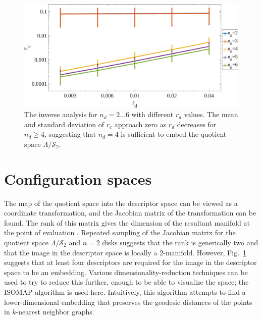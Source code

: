 \documentclass[default,iicol]{sn-jnl}%
\theoremstyle{thmstyleone}%
\theoremstyle{thmstyletwo}%
\theoremstyle{thmstylethree}%
\begin{document}
\begin{figure}
	\centering
	\includegraphics[width=1.0\columnwidth]{figure6.eps}
	\caption{The inverse analysis for $n_d = 2 \dots 6$ with different $r_d$ values. The mean and standard deviation of $r_c$ approach zero as $r_d$ decreases for $n_d \ge 4$, suggesting that $n_d = 4$ is sufficient to embed the quotient space $\Lambda/\mathcal{S}_2$.}
	\label{fig:figure6}
\end{figure}


\section{Configuration spaces}
\label{sec:configuration_spaces}

The map of the quotient space into the descriptor space can be viewed as a coordinate transformation, and the Jacobian matrix of the transformation can be found. The rank of this matrix gives the dimension of the resultant manifold at the point of evaluation \cite{krantz2012implicit}. Repeated sampling of the Jacobian matrix for the quotient space $\Lambda/\mathcal{S}_2$ and $n = 2$ disks suggests that the rank is generically two and that the image in the descriptor space is locally a $2$-manifold. However, Fig.\ \ref{fig:figure6} suggests that at least four descriptors are required for the image in the descriptor space to be an embedding. Various dimensionality-reduction techniques can be used to try to reduce this further, enough to be able to visualize the space; the ISOMAP algorithm \cite{Tenenbaum2319} is used here. Intuitively, this algorithm attempts to find a lower-dimensional embedding that preserves the geodesic distances of the points in $k$-nearest neighbor graphs.
\end{document}
